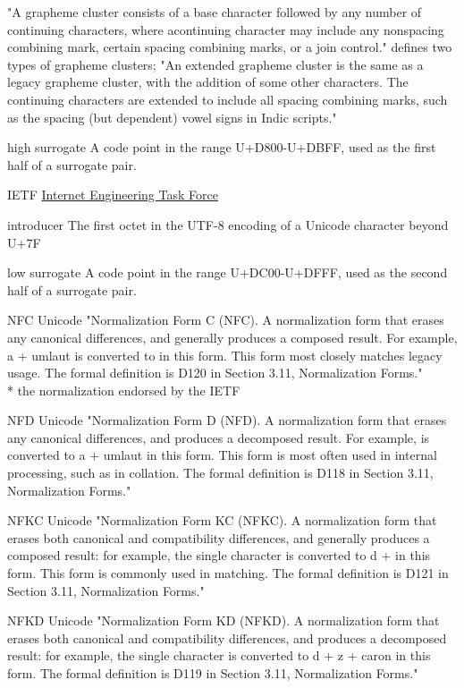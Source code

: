 \documentclass[b4paper]{article}
\begin{document}
\begin{definition}
"A grapheme cluster consists of a base character followed by any
number of continuing characters, where acontinuing character may
include any nonspacing combining mark, certain spacing combining
marks, or a join control."
{\cite{Annex29}} defines two types of grapheme clusters;
"An extended grapheme cluster is the same as a legacy grapheme cluster,
with the addition of some other characters.
The continuing characters are extended to include all spacing combining marks,
such as the spacing (but dependent) vowel signs in Indic scripts."
\item [high surrogate] A code point in the range U+D800-U+DBFF, used
as the first half of a surrogate pair.
\item [IETF] \href{https://ietf.org}{Internet Engineering Task Force}
\item [introducer] The first octet in the UTF-8 encoding of a Unicode character beyond U+7F
\item [low surrogate] A code point in the range U+DC00-U+DFFF, used
as the second half of a surrogate pair.
\item [NFC]  Unicode
"Normalization Form C (NFC). A normalization form that erases any
canonical differences, and generally produces a composed result. For
example, a + umlaut is converted to  in this form. This form most
closely matches legacy usage. The formal definition is D120 in Section
3.11, Normalization Forms."
\\*
the normalization endorsed by the IETF
\item [NFD] Unicode
"Normalization Form D (NFD). A normalization form that erases any
canonical differences, and produces a decomposed result. For example,
 is converted to a + umlaut in this form. This form is most often
used in internal processing, such as in collation. The formal
definition is D118 in Section 3.11, Normalization Forms."

\item [NFKC] Unicode
"Normalization Form KC (NFKC). A normalization form that erases both
canonical and compatibility differences, and generally produces a
composed result: for example, the single  character is converted to d
+  in this form. This form is commonly used in matching. The formal
definition is D121 in Section 3.11, Normalization Forms."

\item [NFKD] Unicode
"Normalization Form KD (NFKD). A normalization form that erases both
canonical and compatibility differences, and produces a decomposed
result: for example, the single  character is converted to d + z +
caron in this form. The formal definition is D119 in Section 3.11,
Normalization Forms."


\end{definition}
\end{document}
